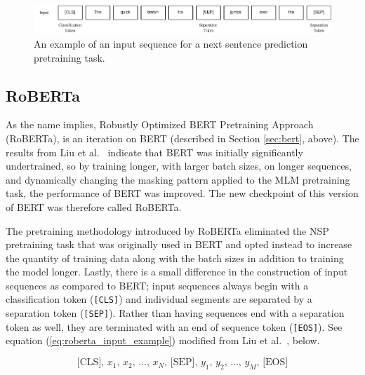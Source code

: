 \documentclass[12pt]{article}
\begin{document}
\begin{figure}[!t]
    \includegraphics[width=\linewidth]{figures/BERT_NSP_input.png}
    \caption{An example of an input sequence for a next sentence prediction pretraining task.}
    \label{fig:bert_nsp_input_example}
\end{figure}

\subsection{RoBERTa}\label{sec:roberta}
As the name implies, Robustly Optimized BERT Pretraining Approach (RoBERTa), is an iteration on BERT (described in Section \ref{sec:bert}, above).
The results from Liu et al.~\cite{liu_roberta_2019} indicate that BERT was initially significantly undertrained, so by training longer, with larger
batch sizes, on longer sequences, and dynamically changing the masking pattern applied to the MLM pretraining task, the performance of BERT was
improved. The new checkpoint of this version of BERT was therefore called RoBERTa.

The pretraining methodology introduced by RoBERTa eliminated the NSP pretraining task that was originally used in BERT and opted instead to increase
the quantity of training data along with the batch sizes in addition to training the model longer. Lastly, there is a small difference in the
construction of input sequences as compared to BERT; input sequences always begin with a classification token (\lstinline|[CLS]|) and individual
segments are separated by a separation token (\lstinline|[SEP]|). Rather than having sequences end with a separation token as well, they are
terminated with an end of sequence token (\lstinline|[EOS]|). See equation (\ref{eq:roberta_input_example}) modified from Liu et
al.~\cite{liu_roberta_2019}, below.

\begin{equation}\label{eq:roberta_input_example}
    \mbox{[CLS], $x_1$, $x_2$, ..., $x_N$, [SEP], $y_1$, $y_2$, ..., $y_M$, [EOS]}
\end{equation}

\end{document}
